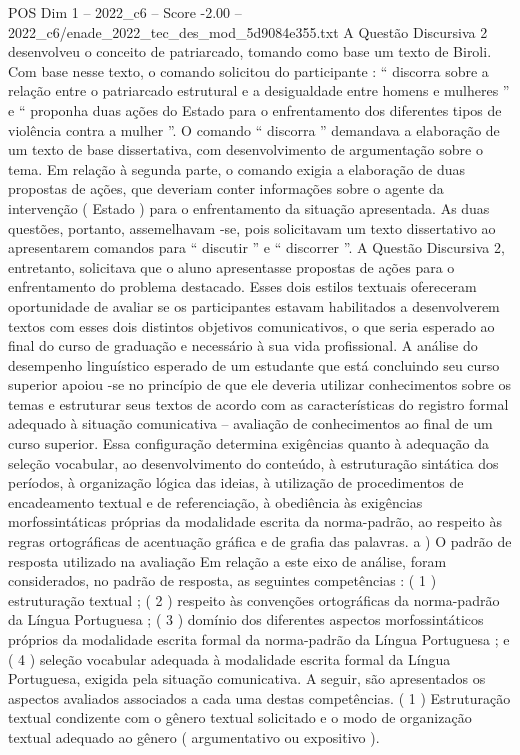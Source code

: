 \begin{textsample}{POS Dim 1 – 2022\_c6 – Score -2.00 – 2022\_c6/enade\_2022\_tec\_des\_mod\_5d9084e355.txt}
A Questão Discursiva 2 desenvolveu o conceito de patriarcado, tomando como base um texto de Biroli.
Com base nesse texto, o comando solicitou do participante : “ discorra sobre a relação entre o patriarcado estrutural e a desigualdade entre homens e mulheres ” e “ proponha duas ações do Estado para o enfrentamento dos diferentes tipos de violência contra a mulher ”.
O comando “ discorra ” demandava a elaboração de um texto de base dissertativa, com desenvolvimento de argumentação sobre o tema.
Em relação à segunda parte, o comando exigia a elaboração de duas propostas de ações, que deveriam conter informações sobre o agente da intervenção ( Estado ) para o enfrentamento da situação apresentada.
As duas questões, portanto, assemelhavam -se, pois solicitavam um texto dissertativo ao apresentarem comandos para “ discutir ” e “ discorrer ”.
A Questão Discursiva 2, entretanto, solicitava que o aluno apresentasse propostas de ações para o enfrentamento do problema destacado.
Esses dois estilos textuais ofereceram oportunidade de avaliar se os participantes estavam habilitados a desenvolverem textos com esses dois distintos objetivos comunicativos, o que seria esperado ao final do curso de graduação e necessário à sua vida profissional.
A análise do desempenho linguístico esperado de um estudante que está concluindo seu curso superior apoiou -se no princípio de que ele deveria utilizar conhecimentos sobre os temas e estruturar seus textos de acordo com as características do registro formal adequado à situação comunicativa – avaliação de conhecimentos ao final de um curso superior.
Essa configuração determina exigências quanto à adequação da seleção vocabular, ao desenvolvimento do conteúdo, à estruturação sintática dos períodos, à organização lógica das ideias, à utilização de procedimentos de encadeamento textual e de referenciação, à obediência às exigências morfossintáticas próprias da modalidade escrita da norma-padrão, ao respeito às regras ortográficas de acentuação gráfica e de grafia das palavras. a ) O padrão de resposta utilizado na avaliação Em relação a este eixo de análise, foram considerados, no padrão de resposta, as seguintes competências : ( 1 ) estruturação textual ; ( 2 ) respeito às convenções ortográficas da norma-padrão da Língua Portuguesa ; ( 3 ) domínio dos diferentes aspectos morfossintáticos próprios da modalidade escrita formal da norma-padrão da Língua Portuguesa ; e ( 4 ) seleção vocabular adequada à modalidade escrita formal da Língua Portuguesa, exigida pela situação comunicativa.
A seguir, são apresentados os aspectos avaliados associados a cada uma destas competências. ( 1 ) Estruturação textual condizente com o gênero textual solicitado e o modo de organização textual adequado ao gênero ( argumentativo ou expositivo ).

\end{textsample}
